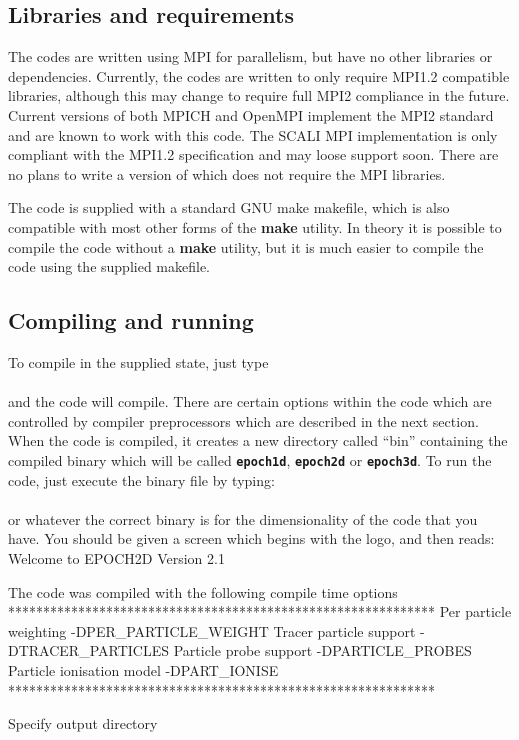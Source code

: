 \documentclass[12pt,a4paper]{article}
\newcommand{\inlinecode}[1]{{\color{warwickred} \bf\texttt{#1}}}
\newcommand{\EPOCH}{{\color{warwickdark}\fontfamily{phv}\selectfont{EPOCH}}}
\newenvironment{boxverbatim}{\lboxverbatim{none}}{\endlboxverbatim}
\begin{document}
\subsection{Libraries and requirements}
The {\EPOCH} codes are written using MPI for parallelism, but have no other
libraries or dependencies. Currently, the codes are written to only require
MPI1.2 compatible libraries, although this may change to require full MPI2
compliance in the future. Current versions of both MPICH and OpenMPI implement
the MPI2 standard and are known to work with this code. The SCALI MPI
implementation is only compliant with the MPI1.2 specification and may loose
support soon.
There are no plans to write a version of {\EPOCH} which does not require
the MPI libraries.

The code is supplied with a standard GNU make makefile, which is also
compatible with most other forms of the {\bf make} utility. In theory it is
possible to compile the code without a {\bf make} utility, but it is much
easier to compile the code using the supplied makefile.

\subsection{Compiling and running {\EPOCH}}

To compile {\EPOCH} in the supplied state, just type\\
\indent\inlinecode{make}\\
and the code will compile. There are certain options within the code which are
controlled by compiler preprocessors which are described in the next
section. When the code is compiled, it creates a new directory called ``bin''
containing the compiled binary which will be called \inlinecode{epoch1d},
\inlinecode{epoch2d} or \inlinecode{epoch3d}. To run the code, just execute the
binary file by typing:\\
\indent\inlinecode{./bin/epoch2d}\\
or whatever the correct binary is for the dimensionality of the code that you
have. You should be given a screen which begins with the {\EPOCH} logo, and then
reads:
\begin{boxverbatim}
Welcome to EPOCH2D Version 2.1

 The code was compiled with the following compile time options
 *************************************************************
 Per particle weighting -DPER_PARTICLE_WEIGHT
 Tracer particle support -DTRACER_PARTICLES
 Particle probe support -DPARTICLE_PROBES
 Particle ionisation model -DPART_IONISE
 *************************************************************

 Specify output directory
\end{boxverbatim}
\end{document}
